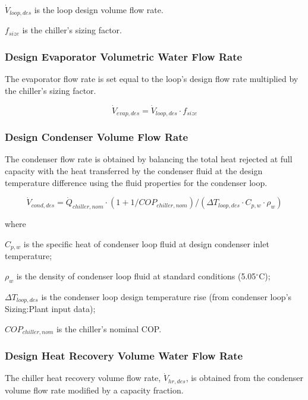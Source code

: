 \( \dot V_{loop,des} \) is the loop design volume flow rate.

\( f_{size} \) is the chiller's sizing factor.

\subsubsection{Design Evaporator Volumetric Water Flow Rate}\label{design-evaporator-volumetric-water-flow-rate}

The evaporator flow rate is set equal to the loop's design flow rate multiplied by the chiller's sizing factor.

\begin{equation}
\dot V_{evap,des} = \dot V_{loop,des} \cdot f_{size}
\end{equation}

\subsubsection{Design Condenser Volume Flow Rate}\label{design-condenser-volume-flow-rate}

The condenser flow rate is obtained by balancing the total heat rejected at full capacity with the heat transferred by the condenser fluid at the design temperature difference using the fluid properties for the condenser loop.

\begin{equation}
\dot V_{cond,des} = \dot Q_{chiller,nom} \cdot (1 + 1/COP_{chiller,nom})/(\Delta T_{loop,des} \cdot C_{p,w} \cdot \rho_w)
\end{equation}

where

\( C_{p,w} \) is the specific heat of condenser loop fluid at design condenser inlet temperature;

\( \rho_w \) is the density of condenser loop fluid at standard conditions (5.05\(^{\circ}\)C);

\( \Delta T_{loop,des} \) is the condenser loop design temperature rise (from condenser loop's Sizing:Plant input data);

\( COP_{chiller,nom} \) is the chiller's nominal COP.

\subsubsection{Design Heat Recovery Volume Water Flow Rate}\label{design-heat-recovery-chiller-volume-water-flow-rate}

The chiller heat recovery volume flow rate, \( \dot V_{hr,des} \), is obtained from the condenser volume flow rate modified by a capacity fraction.

